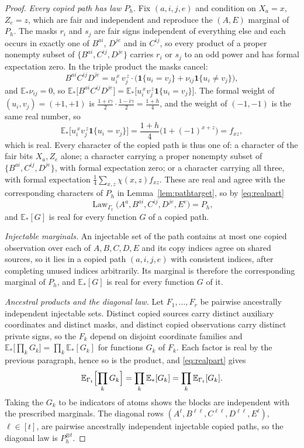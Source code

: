 \documentclass[11pt]{article}
\theoremstyle{plain}
\theoremstyle{definition}
\DeclareMathOperator{\Law}{Law}
\newcommand{\E}{\mathbb E}
\newcommand{\one}{\mathbf 1}
\begin{document}
\begin{proof}
\emph{Every copied path has law $P_h$.} Fix $(a,i,j,e)$ and condition on $X_a=x$, $Z_e=z$, which are fair and independent and reproduce the $(A,E)$ marginal of $P_h$. The masks $r_i$ and $s_j$ are fair signs independent of everything else and each occurs in exactly one of $B^{ai}$, $D^{je}$ and in $C^{ij}$, so every product of a proper nonempty subset of $\{B^{ai},C^{ij},D^{je}\}$ carries $r_i$ or $s_j$ to an odd power and has formal expectation zero. In the triple product the masks cancel:
\[
B^{ai}C^{ij}D^{je}=u_i^{\,x}\,v_j^{\,z}\cdot\bigl(\one\{u_i=v_j\}+\nu_{ij}\one\{u_i\ne v_j\}\bigr),
\]
and $\E_\ast\nu_{ij}=0$, so $\E_\ast\bigl[B^{ai}C^{ij}D^{je}\bigr]=\E_\ast\bigl[u_i^{\,x}v_j^{\,z}\one\{u_i=v_j\}\bigr]$. The formal weight of $(u_i,v_j)=(+1,+1)$ is $\frac{1+i\gamma}2\cdot\frac{1-i\gamma}2=\frac{1+h}4$, and the weight of $(-1,-1)$ is the same real number, so
\[
\E_\ast\bigl[u_i^{\,x}v_j^{\,z}\one\{u_i=v_j\}\bigr]=\frac{1+h}4\bigl(1+(-1)^{x+z}\bigr)=f_{xz},
\]
which is real. Every character of the copied path is thus one of: a character of the fair bits $X_a,Z_e$ alone; a character carrying a proper nonempty subset of $\{B^{ai},C^{ij},D^{je}\}$, with formal expectation zero; or a character carrying all three, with formal expectation $\frac14\sum_{x,z}\chi(x,z)f_{xz}$. These are real and agree with the corresponding characters of $P_h$ in Lemma~\ref{lem:pathtarget}, so by \eqref{eq:realpart}
\[
\Law_{\Gamma_t}\bigl(A^a,B^{ai},C^{ij},D^{je},E^e\bigr)=P_h,
\]
and $\E_\ast[G]$ is real for every function $G$ of a copied path.

\emph{Injectable marginals.} An injectable set of the path contains at most one copied observation over each of $A,B,C,D,E$ and its copy indices agree on shared sources, so it lies in a copied path $(a,i,j,e)$ with consistent indices, after completing unused indices arbitrarily. Its marginal is therefore the corresponding marginal of $P_h$, and $\E_\ast[G]$ is real for every function $G$ of it.

\emph{Ancestral products and the diagonal law.} Let $F_1,\dots,F_r$ be pairwise ancestrally independent injectable sets. Distinct copied sources carry distinct auxiliary coordinates and distinct masks, and distinct copied observations carry distinct private signs, so the $F_k$ depend on disjoint coordinate families and $\E_\ast\bigl[\prod_k G_k\bigr]=\prod_k\E_\ast[G_k]$ for functions $G_k$ of $F_k$. Each factor is real by the previous paragraph, hence so is the product, and \eqref{eq:realpart} gives
\[
\E_{\Gamma_t}\Bigl[\prod_kG_k\Bigr]=\prod_k\E_\ast[G_k]=\prod_k\E_{\Gamma_t}[G_k].
\]
Taking the $G_k$ to be indicators of atoms shows the blocks are independent with the prescribed marginals. The diagonal rows $(A^\ell,B^{\ell\ell},C^{\ell\ell},D^{\ell\ell},E^\ell)$, $\ell\in[t]$, are pairwise ancestrally independent injectable copied paths, so the diagonal law is $P_h^{\otimes t}$.


\end{proof}
\end{document}
